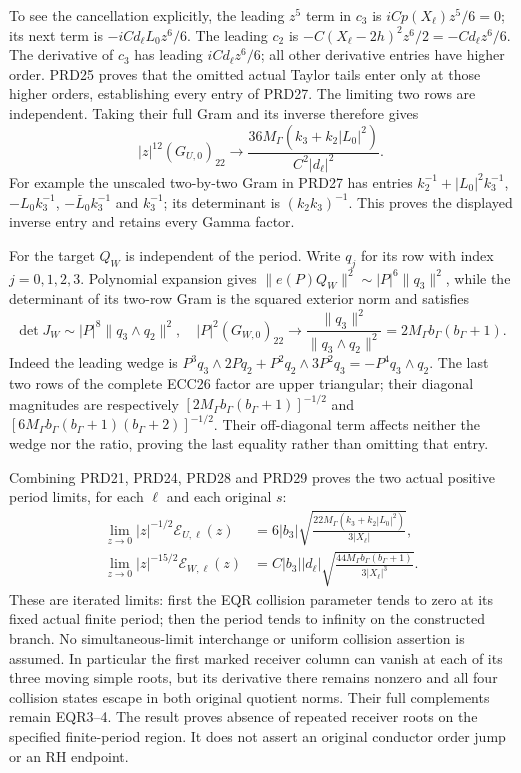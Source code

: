\documentclass[11pt]{article}
\begin{document}
To see the cancellation explicitly, the leading $z^5$ term in
$c_3$ is $iCp(X_\ell)z^5/6=0$; its next term is
$-iCd_\ell L_0z^6/6$. The leading $c_2$ is
$-C(X_\ell-2h)^2z^6/2=-Cd_\ell z^6/6$.
The derivative of $c_3$ has leading $iCd_\ell z^6/6$;
all other derivative entries have higher order. PRD25 proves
that the omitted actual Taylor tails enter only at those higher
orders, establishing every entry of PRD27.
The limiting two rows are independent. Taking their full Gram
and its inverse therefore gives
\[
 |z|^{12}(G_{U,0})_{22}\longrightarrow
 \frac{36M_\Gamma(k_3+k_2|L_0|^2)}{C^2|d_\ell|^2}.
 \tag{PRD28}
\]
For example the unscaled two-by-two Gram in PRD27 has entries
$k_2^{-1}+|L_0|^2k_3^{-1}$, $-L_0k_3^{-1}$,
$-\bar L_0k_3^{-1}$ and $k_3^{-1}$; its determinant is
$(k_2k_3)^{-1}$. This proves the displayed inverse entry and
retains every Gamma factor.

For the target $Q_W$ is independent of the period. Write $q_j$
for its row with index $j=0,1,2,3$. Polynomial expansion gives
$\|e(P)Q_W\|^2\sim|P|^6\|q_3\|^2$, while the determinant
of its two-row Gram is the squared exterior norm and satisfies
\[
 \det J_W\sim |P|^8\|q_3\wedge q_2\|^2,
 \quad
 |P|^2(G_{W,0})_{22}\longrightarrow
       \frac{\|q_3\|^2}{\|q_3\wedge q_2\|^2}
       =2M_\Gamma b_\Gamma(b_\Gamma+1).
 \tag{PRD29}
\]
Indeed the leading wedge is
$P^3q_3\wedge2Pq_2+P^2q_2\wedge3P^2q_3
=-P^4q_3\wedge q_2$.
The last two rows of the complete ECC26 factor are upper triangular;
their diagonal magnitudes are respectively
$[2M_\Gamma b_\Gamma(b_\Gamma+1)]^{-1/2}$ and
$[6M_\Gamma b_\Gamma(b_\Gamma+1)(b_\Gamma+2)]^{-1/2}$.
Their off-diagonal term affects neither the wedge nor the ratio,
proving the last equality rather than omitting that entry.

Combining PRD21, PRD24, PRD28 and PRD29 proves the two actual
positive period limits, for each $\ell$ and each original $s$:
\[
\begin{split}
 \lim_{z\to0}|z|^{-1/2}\mathcal E_{U,\ell}(z)
 &=6|b_3|\sqrt{\frac{22M_\Gamma(k_3+k_2|L_0|^2)}{3|X_\ell|}},\\
 \lim_{z\to0}|z|^{-15/2}\mathcal E_{W,\ell}(z)
 &=C|b_3||d_\ell|
     \sqrt{\frac{44M_\Gamma b_\Gamma(b_\Gamma+1)}
                         {3|X_\ell|^3}}.
\end{split}\tag{PRD30}
\]
These are iterated limits: first the EQR collision parameter tends
to zero at its fixed actual finite period; then the period tends
to infinity on the constructed branch. No simultaneous-limit
interchange or uniform collision assertion is assumed.
In particular the first marked receiver column can vanish at
each of its three moving simple roots, but its derivative there
remains nonzero and all four collision states escape in both
original quotient norms. Their full complements remain EQR3--4.
The result proves absence of repeated receiver roots on the
specified finite-period region. It does not assert an original
conductor order jump or an RH endpoint.
\end{document}
